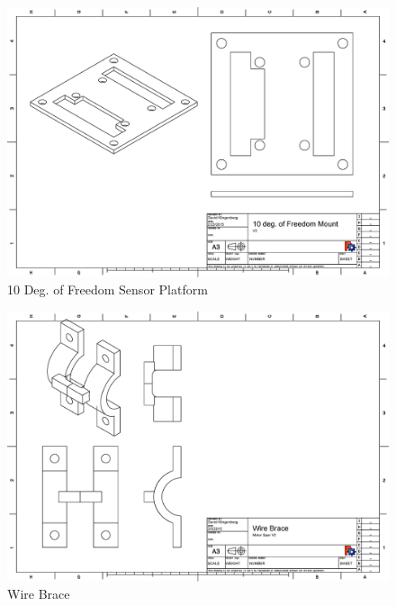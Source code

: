 \documentclass[pdftex,11pt]{article}
\begin{document}
\begin{figure}[!h]
	\centering
		\includegraphics[width=1\textwidth]{./graphics/10_DOF_plate.eps}
	\caption{10 Deg. of Freedom Sensor Platform}
	\label{fig:10freedomplatform}
\end{figure}

\begin{figure}[!h]
	\centering
		\includegraphics[width=1\textwidth]{./graphics/wire_brace_lowerclamp.eps}
	\caption{Wire Brace}
	\label{fig:wirebrace}
\end{figure}
\end{document}
